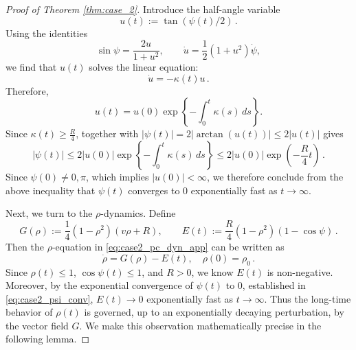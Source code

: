 \documentclass[10pt]{article}
\theoremstyle{definition}
\theoremstyle{definition}
\numberwithin{equation}{section}
\newcommand{\Drho}{\Dot{\rho}}
\newcommand{\Dpsi}{\Dot{\psi}}
\begin{document}
\begin{proof}[Proof of Theorem \ref{thm:case_2}]
Introduce the half-angle variable
\[
u(t) := \tan (\psi(t) / 2) \, .
\]
Using the identities
\begin{equation*}
\sin \psi = \frac{2u}{1 + u^2}, \qquad  \Dot{u} = \frac 1 2 (1 + u^2) \Dpsi,
\end{equation*}
we find that $u(t)$ solves the linear equation:
\begin{equation*}
    \Dot{u} = - \kappa(t) u \, .
\end{equation*}
Therefore,
\begin{equation}
    u(t) = u(0) \exp \left\{ -\int_0^t \kappa(s) \, ds \right\}.
\end{equation}
Since $\kappa(t) \geq \frac {R} 4$, together with $|\psi(t)| = 2 |\arctan (u(t))| \leq 2|u(t)|$ gives
\begin{equation}\label{eq:case2_psi_conv}
    |\psi(t)| \leq 2|u(0)| \exp \left\{ -\int_0^t \kappa(s) \, ds \right\} \leq 2 |u(0)| \exp \left( - \frac{R}{4} t \right) \, .
\end{equation}
Since $\psi(0) \neq 0, \pi$, which implies $|u(0)| < \infty$, we therefore conclude from the above inequality that $\psi(t)$ converges to $0$ exponentially fast as $t \rightarrow \infty$.

Next, we turn to the $\rho$-dynamics.
Define
\begin{equation}\label{eq:case2_func_G_and_E}
G(\rho) := \frac{1}{4} (1 - \rho^2) (v\rho + R), \qquad E(t) := \frac{R}{4} (1 - \rho^2) (1 - \cos \psi) \, .
\end{equation}
Then the $\rho$-equation in \eqref{eq:case2_pc_dyn_app} can be written as
\begin{equation}\label{eq:case2_rho_dyn_pt_form}
\Drho = G(\rho) - E(t), \quad \rho(0) = \rho_0 \, .
\end{equation}
Since $\rho(t) \leq 1$, $\cos \psi(t) \leq 1$, and $R > 0$, we know $E(t)$ is non-negative.
Moreover, by the exponential convergence of $\psi(t)$ to $0$, established in \eqref{eq:case2_psi_conv}, $E(t) \rightarrow 0$ exponentially fast as $t \rightarrow \infty$.
Thus the long-time behavior of $\rho(t)$ is governed, up to an exponentially decaying perturbation, by the vector field $G$.
We make this observation mathematically precise in the following lemma.


\end{proof}
\end{document}
